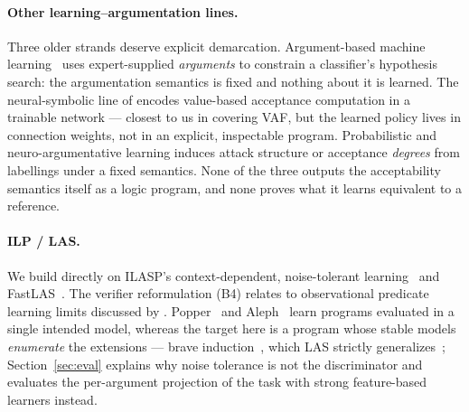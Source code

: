 \documentclass[review,12pt]{elsarticle}
\theoremstyle{definition}
\theoremstyle{remark}
\begin{document}
\paragraph{Other learning--argumentation lines.} Three older strands deserve
explicit demarcation. Argument-based machine learning~\citep{mozina2007}
uses expert-supplied \emph{arguments} to constrain a classifier's hypothesis
search: the argumentation semantics is fixed and nothing about it is learned.
The neural-symbolic line of \citet{garcez2005vaf} encodes value-based
acceptance computation in a trainable network --- closest to us in covering
VAF, but the learned policy lives in connection weights, not in an explicit,
inspectable program. Probabilistic and neuro-argumentative learning
\citep{riveret2016learning} induces attack structure or acceptance
\emph{degrees} from labellings under a fixed semantics. None of the three
outputs the acceptability semantics itself as a logic program, and none
proves what it learns equivalent to a reference.

\paragraph{ILP / LAS.} We build directly on ILASP's context-dependent,
noise-tolerant learning~\citep{law2016,law2018,law2019,law2018phd} and
FastLAS~\citep{law2020}. The verifier reformulation (B4) relates to
observational predicate learning limits discussed by \citet{law2020}.
Popper~\citep{cropper2021popper} and Aleph~\citep{srinivasan2001aleph}
learn programs evaluated in a single intended model, whereas the target here
is a program whose stable models \emph{enumerate} the extensions --- brave
induction~\citep{sakama2009brave}, which LAS strictly
generalizes~\citep{law2018phd,law2019}; Section~\ref{sec:eval} explains why
noise tolerance is not the discriminator and evaluates the per-argument
projection of the task with strong feature-based learners instead.
\end{document}
